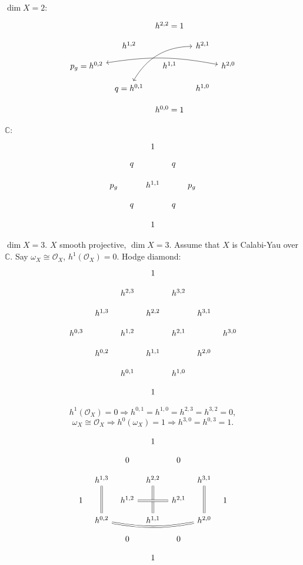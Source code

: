 \documentclass[12pt]{article}
\theoremstyle{definition}
\begin{document}
$\dim X=2$:
\[\begin{tikzcd}[column sep = tiny,row sep = small]&&h^{2,2}=1\\&h^{1,2}&&h^{2,1}\\p_g=h^{0,2}\arrow[<->,rrrr,bend left=10]&&h^{1,1}&&h^{2,0}\\&q=h^{0,1}\arrow[<->,rruu,bend left]&&h^{1,0}\\&&h^{0,0}=1\end{tikzcd}\]

$\mathbb C$:
\[\begin{tikzcd}[column sep = tiny,row sep = small]&&1\\&q&&q\\p_g&&h^{1,1}&&p_g\\&q&&q\\&&1\end{tikzcd}\]

$\dim X=3$. $X$ smooth projective, $\dim X=3$. Assume that $X$ is Calabi-Yau over $\mathbb C$. Say $\omega_X\cong\mathcal O_X$, $h^1(\mathcal O_X)=0$. Hodge diamond:
\[\begin{tikzcd}[column sep = tiny,row sep = small]&&&1\\&&h^{2,3}&&h^{3,2}\\&h^{1,3}&&h^{2,2}&&h^{3,1}\\h^{0,3}&&h^{1,2}&&h^{2,1}&&h^{3,0}\\&h^{0,2}&&h^{1,1}&&h^{2,0}\\&&h^{0,1}&&h^{1,0}\\&&&1\end{tikzcd}\]

\[h^1(\mathcal O_X)=0\Rightarrow h^{0,1}=h^{1,0}=h^{2,3}=h^{3,2}=0,\]
\[\omega_X\cong\mathcal O_X\Rightarrow h^0(\omega_X)=1\Rightarrow h^{3,0}=h^{0,3}=1.\]

\[\begin{tikzcd}[column sep = tiny,row sep = small]&&&1\\&&0&&0\\&h^{1,3}\arrow[dd,-,double equal sign distance,double]&&h^{2,2}\arrow[dd,-,double equal sign distance,double]&&h^{3,1}\arrow[dd,-,double equal sign distance,double]\\1&&h^{1,2}\arrow[rr,-,double equal sign distance,double]&&h^{2,1}&&1\\&h^{0,2}\arrow[rrrr,-,double equal sign distance,double,bend right=10]&&h^{1,1}&&h^{2,0}\\&&0&&0\\&&&1\end{tikzcd}\]
\end{document}

